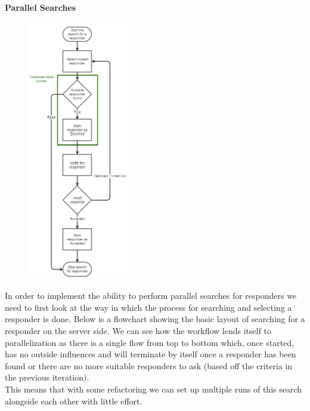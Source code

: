 \documentclass{article}
\begin{document}
	\paragraph{Parallel Searches}
\begin{figure}
  \begin{center}
    \includegraphics[width=0.4\textwidth]{"Iteration3/parallelization_of_search (4) (1)"}
  \end{center}
  \vspace{-250pt}
\end{figure}
	In order to implement the ability to perform parallel searches for responders we need to first look at the way in which the process for searching and selecting a responder is done. Below is a flowchart showing the basic layout of searching for a responder on the server side. We can see how the workflow lends itself to parallelization as there is a single flow from top to bottom which, once started, has no outside influences and will terminate by itself once a responder has been found or there are no more suitable responders to ask (based off the criteria in the previous iteration).\\

This means that with some refactoring we can set up multiple runs of this search alongside each other with little effort.\\
\end{document}
